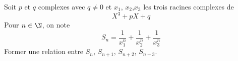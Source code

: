 Soit $p$ et $q$ complexes avec $q\neq 0$ et $x_1$, $x_2$,$x_3$ les trois racines complexes de 
\begin{displaymath}
 X^3+pX+q
\end{displaymath}
Pour $n\in\N$, on note
\begin{displaymath}
 S_n = \frac{1}{x_1^n} + \frac{1}{x_2^n} + \frac{1}{x_3^n}
\end{displaymath}
Former une relation entre $S_n$, $S_{n+1}$, $S_{n+2}$, $S_{n+3}$.

\bigskip
